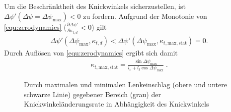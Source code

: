 Um die Beschränktheit des Knickwinkels sicherzustellen, ist $\Delta\psi'(\Delta\psi=\Delta\psi_\text{max}) < 0$ zu fordern. Aufgrund der Monotonie von \eqref{equ:zerodynamics} ($\tfrac{\partial \Delta\psi'}{\partial \kappa_{t,d}}<0$) gilt
\begin{align*}
	\Delta\psi'(\Delta\psi_\text{max}, \kappa_{t,d}) < \Delta\psi'(\Delta\psi_{\text{max}}, \kappa_{t,\text{max},\text{stat}}) = 0.
\end{align*}
Durch Auflösen von \eqref{equ:zerodynamics} ergibt sich damit
\begin{align}
	\kappa_{t,\text{max}, \text{stat}} = \frac{\sin \Delta\psi_\text{max}}{l_c + l_t \cos \Delta\psi_\text{max}} \;. \label{eq:kappatdmax}
\end{align}

\begin{figure}[ht]
	\def\xlabel{$\Delta\psi$ in \unit{rad}}
	\def\ylabel{$\,\,\,\,\,\,\,\,\,\,\,\,\,\,\,\Delta\psi'(\pm\delta_{\text{max},\text{stat}})$ in \unitfrac{rad}{s}}		
	
	\renewcommand{\matlabtextA}{\scriptsize}
	\renewcommand{\matlabtextB}{\scriptsize}
	
    \caption[Realisierbare Knickwinkeländerungsraten]{Durch maximalen und minimalen Lenkeinschlag  (obere und untere schwarze Linie) gegebener Bereich (grau) der Knickwinkeländerungsrate in Abhängigkeit des Knickwinkels }
    \label{fig:Maximaler_Knickwinkel_Vergleich}
\end{figure}


